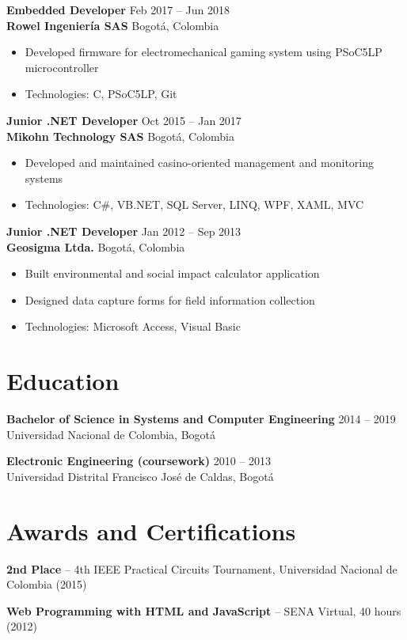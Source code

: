 \documentclass[11pt,a4paper]{article}
\begin{document}
\vspace{6pt}

\textbf{Embedded Developer} \hfill Feb 2017 -- Jun 2018 \\
\textbf{Rowel Ingenier\'{i}a SAS} \hfill Bogot\'{a}, Colombia
\begin{itemize}
    \item Developed firmware for electromechanical gaming system using PSoC5LP microcontroller
    \item Technologies: C, PSoC5LP, Git
\end{itemize}

\vspace{6pt}

\textbf{Junior .NET Developer} \hfill Oct 2015 -- Jan 2017 \\
\textbf{Mikohn Technology SAS} \hfill Bogot\'{a}, Colombia
\begin{itemize}
    \item Developed and maintained casino-oriented management and monitoring systems
    \item Technologies: C\#, VB.NET, SQL Server, LINQ, WPF, XAML, MVC
\end{itemize}

\vspace{6pt}

\textbf{Junior .NET Developer} \hfill Jan 2012 -- Sep 2013 \\
\textbf{Geosigma Ltda.} \hfill Bogot\'{a}, Colombia
\begin{itemize}
    \item Built environmental and social impact calculator application
    \item Designed data capture forms for field information collection
    \item Technologies: Microsoft Access, Visual Basic
\end{itemize}

\section{Education}

\textbf{Bachelor of Science in Systems and Computer Engineering} \hfill 2014 -- 2019 \\
Universidad Nacional de Colombia, Bogot\'{a}

\vspace{6pt}

\textbf{Electronic Engineering (coursework)} \hfill 2010 -- 2013 \\
Universidad Distrital Francisco Jos\'{e} de Caldas, Bogot\'{a}

\section{Awards and Certifications}

\textbf{2nd Place} -- 4th IEEE Practical Circuits Tournament, Universidad Nacional de Colombia (2015)

\textbf{Web Programming with HTML and JavaScript} -- SENA Virtual, 40 hours (2012)
\end{document}
